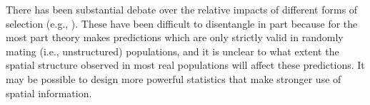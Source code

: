 \documentclass[11pt, oneside]{article}   	%
\newcommand\citet{\cite}
\newcommand\citep{\cite}
\renewcommand{\revpoint}[2]{\relax}
\begin{document}
There has been substantial debate over the relative impacts of different forms of selection
(e.g., \citet{charlesworth1997effects,charlesworth2012effects,pease2013accurate,hedrick2013adaptive,burri2015linked,corbettdetig2015natural,harris2016genetic,martin2016natural,phung2016determining,stankowski2018tempo}). \revpoint{2}{16}
These have been difficult to disentangle in part because for the most part
theory makes predictions which are only strictly valid in randomly mating (i.e., unstructured) populations,
and it is unclear to what extent the spatial structure observed in most real populations will affect these predictions.
It may be possible to design more powerful statistics that make stronger use of spatial information.


\end{document}
